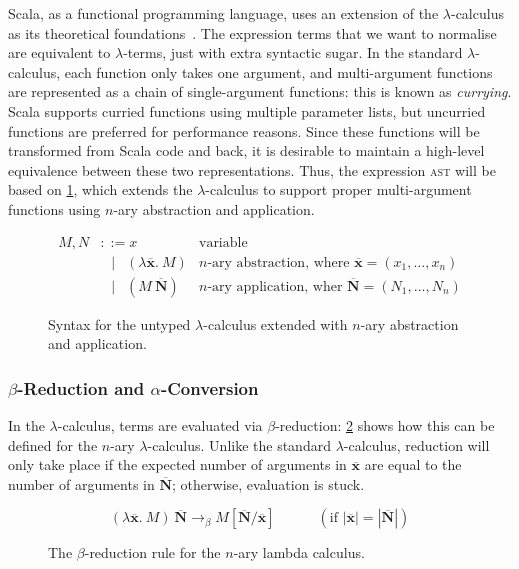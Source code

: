 \documentclass[../../../main.tex]{subfiles}
\begin{document}
Scala, as a functional programming language, uses an extension of the $\lambda$-calculus~\cite{church_lambda_1936} as its theoretical foundations~\cite{cremet_core_2006,amin_essence_2016}.
The expression terms that we want to normalise are equivalent to $\lambda$-terms, just with extra syntactic sugar.
In the standard $\lambda$-calculus, each function only takes one argument, and multi-argument functions are represented as a chain of single-argument functions: this is known as \emph{currying}.
Scala supports curried functions using multiple parameter lists, but uncurried functions are preferred for performance reasons.
Since these functions will be transformed from Scala code and back, it is desirable to maintain a high-level equivalence between these two representations.
Thus, the expression \textsc{ast} will be based on \cref{fig:lambda-calculus}, which extends the $\lambda$-calculus to support proper multi-argument functions using $n$-ary abstraction and application.

\begin{figure}
\begin{align*}
M, N &\mathrel{::=} x & \text{variable} \\
&\mathrel{\enspace\mid\enspace} (\lambda \overline{\mathbf{x}}.\ M) & \text{$n$-ary abstraction, where } \overline{\mathbf{x}} = (x_1, \ldots, x_n) \\
&\mathrel{\enspace\mid\enspace} (M\ \overline{\mathbf{N}}) & \text{$n$-ary application, wher } \overline{\mathbf{N}} = (N_1, \ldots, N_n)
\end{align*}
\caption{Syntax for the untyped $\lambda$-calculus extended with $n$-ary abstraction and application.}
\label{fig:lambda-calculus}
\end{figure}

\subsubsection{$\beta$-Reduction and $\alpha$-Conversion}
In the $\lambda$-calculus, terms are evaluated via $\beta$-reduction: \cref{fig:beta-reduction} shows how this can be defined for the $n$-ary $\lambda$-calculus.
Unlike the standard $\lambda$-calculus, reduction will only take place if the expected number of arguments in $\overline{\mathbf{x}}$ are equal to the number of arguments in $\overline{\mathbf{N}}$; otherwise, evaluation is stuck.

\begin{figure}[htbp]
\begin{equation*}
(\lambda \overline{\mathbf{x}} .\ M)\ \overline{\mathbf{N}} \rightarrow_\beta M[\overline{\mathbf{N}}/\overline{\mathbf{x}}] \hspace{3em} (\text{if } | \overline{\mathbf{x}} | = | \overline{\mathbf{N}} |)
\end{equation*}
\caption{The $\beta$-reduction rule for the $n$-ary lambda calculus.}
\label{fig:beta-reduction}
\end{figure}
\end{document}

